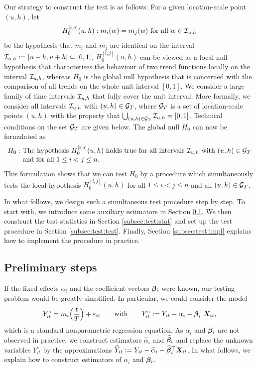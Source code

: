 \documentclass[12pt]{article}
\begin{document}
Our strategy to construct the test is as follows: For a given location-scale point $(u,h)$, let
\[ H_0^{[i, j]}(u, h): m_i(w) = m_j(w) \text{ for all } w \in \mathcal{I}_{u, h} \] 
be the hypothesis that $m_i$ and $m_j$ are identical on the interval $\mathcal{I}_{u, h} := [u-h,u+h] \subseteq [0,1]$. $H_0^{[i, j]}(u, h)$ can be viewed as a local null hypothesis that characterises the behaviour of two trend functions locally on the interval $\mathcal{I}_{u, h}$, whereas $H_0$ is the global null hypothesis that is concerned with the comparison of all trends on the whole unit interval $[0, 1]$. We consider a large family of time intervals $\mathcal{I}_{u, h}$ that fully cover the unit interval. More formally, we consider all intervals $\mathcal{I}_{u, h}$ with $(u,h) \in \mathcal{G}_T$, where $\mathcal{G}_T$ is a set of location-scale points $(u,h)$ with the property that $\bigcup_{(u, h) \in \mathcal{G}_T} \mathcal{I}_{u, h} = [0,1]$. Technical conditions on the set $\mathcal{G}_T$ are given below. The global null $H_0$ can now be formulated as 
\begin{align*}
H_0: \ & \text{The hypothesis } H_0^{[i, j]}(u, h) \text{ holds true for all intervals }  \mathcal{I}_{u, h} \text{ with } (u, h) \in \mathcal{G}_T \\[-0.075cm] & \text{and for all } 1 \le i < j \le n. 
\end{align*} 
This formulation shows that we can test $H_0$ by a procedure which simultaneously tests the local hypothesis $H_0^{[i, j]}(u, h)$ for all $1 \le i < j \le n$ and all $(u,h) \in \mathcal{G}_T$. 


In what follows, we design such a simultaneous test procedure step by step. To start with, we introduce some auxiliary estimators in Section \ref{subsec:test:prep}. We then construct the test statistics in Section \ref{subsec:test:stat} and set up the test procedure in Section \ref{subsec:test:test}. Finally, Section \ref{subsec:test:impl} explains how to implement the procedure in practice. 


\subsection{Preliminary steps}\label{subsec:test:prep}


If the fixed effects $\alpha_i$ and the coefficient vectors $\bm{\beta}_i$ were known, our testing problem would be greatly simplified. In particular, we could consider the model
\begin{align*}
Y_{it}^\circ = m_i \Big( \frac{t}{T} \Big) + \varepsilon_{it} \qquad \text{with} \qquad Y_{it}^\circ := Y_{it} - \alpha_i - \bm{\beta}_i^\top \boldsymbol{X}_{it}, 
\end{align*}
which is a standard nonparametric regression equation. As $\alpha_i$ and $\bm{\beta}_i$ are not observed in practice, we construct estimators $\widehat{\alpha}_i$ and $\widehat{\bm{\beta}}_i$ and replace the unknown variables $Y_{it}^\circ$ by the approximations 
$\widehat{Y}_{it} := Y_{it} -\widehat{\alpha}_i - \widehat{\bm{\beta}}_i^\top \boldsymbol{X}_{it}$. 
In what follows, we explain how to construct estimators of $\alpha_i$ and $\bm{\beta}_i$. 
\end{document}

